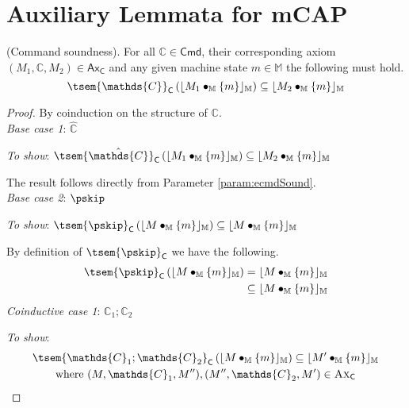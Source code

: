 \section{Auxiliary Lemmata for mCAP}

\thm \label{thm:cSound} (Command soundness). For all $\mathds{C} \in \mathsf{Cmd}$, their corresponding axiom $(M_1, \mathds{C}, M_2) \in \mathsf{Ax}_\mathsf{C}$ and any given machine state $m \in \mathbb{M}$ the following must hold.
\[
	\tsem{\mathds{C}}_\mathsf{C} \left( \lfloor M_1 \bullet_\mathbb{M} \{m\} \rfloor_\mathbb{M} \right) \subseteq \lfloor M_2 \bullet_\mathbb{M} \{m\} \rfloor_\mathbb{M}
\]

{\parindent0pt
\begin{proof}
By coinduction on the structure of $\mathds{C}$. \\
\indline
\textit{Base case 1}: $\mathds{\hat{C}}$

\textit{To show}: $\tsem{\hat{\mathds{C}}}_\mathsf{C} \left( \lfloor M_1 \bullet_\mathbb{M} \{m\} \rfloor_\mathbb{M} \right) \subseteq \lfloor M_2 \bullet_\mathbb{M} \{m\} \rfloor_\mathbb{M}$

The result follows directly from Parameter \ref{param:ecmdSound}. \\
\indline
\textit{Base case 2}: $\pskip$

\textit{To show}: $\tsem{\pskip}_\mathsf{C} \left( \lfloor M \bullet_\mathbb{M} \{m\} \rfloor_\mathbb{M}\right) \subseteq \lfloor M \bullet_\mathbb{M} \{m\} \rfloor_\mathbb{M}$

By definition of $\tsem{\pskip}_\mathsf{C}$ we have the following.
\begin{align*}
	\tsem{\pskip}_\mathsf{C} \left( \lfloor M \bullet_\mathbb{M} \{m\} \rfloor_\mathbb{M} \right)
	&=
	\lfloor M \bullet_\mathbb{M} \{m\} \rfloor_\mathbb{M}
	\\
	&\subseteq \lfloor M \bullet_\mathbb{M} \{m\} \rfloor_\mathbb{M}
\end{align*} 
\indline
\textit{Coinductive case 1}: $\mathds{C}_1 ; \mathds{C}_2$

\textit{To show}:
\begin{gather*}
	\tsem{\mathds{C}_1 ; \mathds{C}_2}_\mathsf{C} \left( \lfloor M \bullet_\mathbb{M} \{m\} \rfloor_\mathbb{M} \right) \subseteq \lfloor M' \bullet_\mathbb{M} \{m\} \rfloor_\mathbb{M}
	\\
	\text{where } (M, \mathds{C}_1, M''), (M'', \mathds{C}_2, M') \in \textsc{Ax}_\mathsf{C}
\end{gather*}


\end{proof}}
